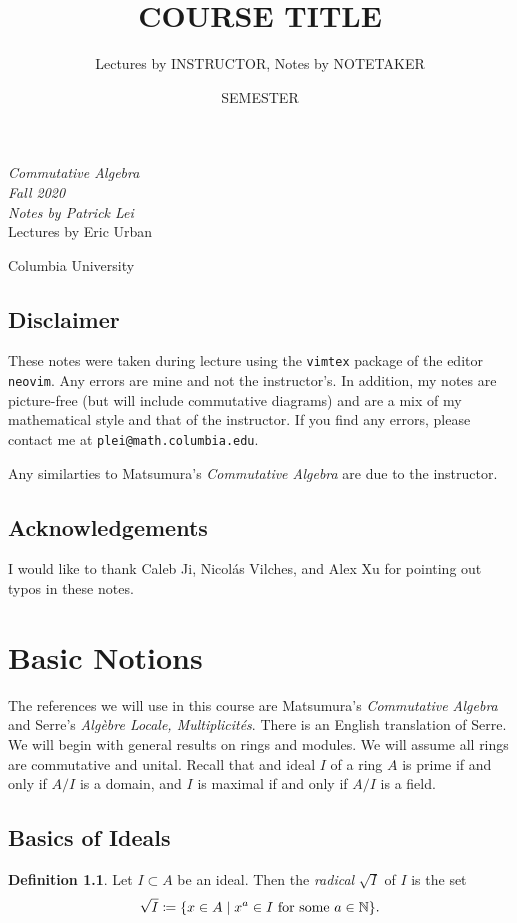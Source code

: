 \documentclass[leqno, openany]{memoir}
\title{COURSE TITLE}
\author{Lectures by INSTRUCTOR, Notes by NOTETAKER}
\date{SEMESTER}
\theoremstyle{definition}
\newtheorem{defn}[thm]{Definition}
\theoremstyle{remark}
\theoremstyle{plain}
\theoremstyle{definition}
\theoremstyle{remark}
\newcommand{\N}{\mathbb{N}}
\newcommand*{\titleSW}
    {\begingroup%
    \raggedleft
    \vspace*{\baselineskip}
    {\Huge\itshape Commutative Algebra \\ Fall 2020}\\[\baselineskip]
    {\large\itshape Notes by Patrick Lei}\\[0.2\textheight]
    {\Large Lectures by Eric Urban}\par
    \vfill
    {\Large \sffamily Columbia University}
    \vspace*{\baselineskip}
\endgroup}
\begin{document}
    
\begin{titlingpage}
\titleSW
\end{titlingpage}

\thispagestyle{empty}
\section*{Disclaimer}%
\label{sec:disclaimer}

These notes were taken during lecture using the \texttt{vimtex} package of the
editor \texttt{neovim}.  Any errors are mine and not the instructor's.  In
addition, my notes are picture-free (but will include commutative diagrams) and
are a mix of my mathematical style and that of the instructor.  If you find any
errors, please contact me at \texttt{plei@math.columbia.edu}.

Any similarties to Matsumura's \textit{Commutative Algebra} are due to the
instructor.

\section*{Acknowledgements}%

I would like to thank Caleb Ji, Nicol\'as Vilches, and Alex Xu for pointing out
typos in these notes.

\newpage



\tableofcontents

\chapter{Basic Notions}%

The references we will use in this course are Matsumura's \textit{Commutative
Algebra} and Serre's \textit{Alg\`ebre Locale, Multiplicit\'es}. There is an
English translation of Serre.  We will begin with general results on rings and
modules. We will assume all rings are commutative and unital. Recall that and
ideal $I$ of a ring $A$ is prime if and only if $A/I$ is a domain, and $I$ is
maximal if and only if $A/I$ is a field.

\section{Basics of Ideals}%


\begin{defn} Let $I \subset A$ be an ideal. Then the \textit{radical}
    $\sqrt{I}$ of $I$ is the set \[ \sqrt{I} \coloneqq \qty{x \in A \mid x^a
    \in I \text{ for some } a \in \N}. \] \end{defn}
\end{document}
